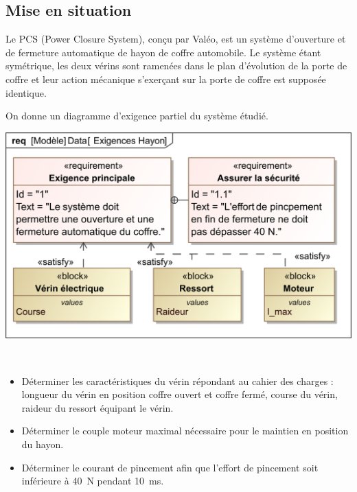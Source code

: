 \documentclass[10pt,fleqn]{article} %
\begin{document}

\vspace{4.5cm}
\pagestyle{fancy}
\thispagestyle{plain}


\def\columnseprulecolor{\color{ocre}}
\setlength{\columnseprule}{0.4pt} 

\ifprof
\begin{multicols}{2}
\else
\begin{multicols}{2}
\fi
\section*{Mise en situation}
\ifprof
\else
Le PCS (Power Closure System), conçu par Valéo, est un système d’ouverture et de fermeture automatique de
hayon de coffre automobile.
Le système étant symétrique, les deux vérins sont ramenées dans 
le plan d’évolution de la porte de coffre et leur action mécanique s’exerçant sur la porte de coffre est supposée identique.

On donne un diagramme d'exigence partiel du système étudié. 

\begin{center}
\includegraphics[width=\linewidth]{images/fig_01_req}
\end{center}


\begin{obj}~\\
\vspace{-.3cm}
\begin{itemize}
\item Déterminer les caractéristiques du vérin répondant au cahier des charges : longueur
du vérin en position coffre ouvert et coffre fermé, course du vérin, raideur du ressort équipant le vérin. 
\item Déterminer le couple moteur maximal nécessaire pour le maintien en position du hayon.
\item Déterminer le courant de pincement afin que l'effort de pincement soit inférieure à \SI{40}{N} pendant \SI{10}{ms}.
\end{itemize}
\end{obj}





\end{multicols}
\end{multicols}
\end{document}
